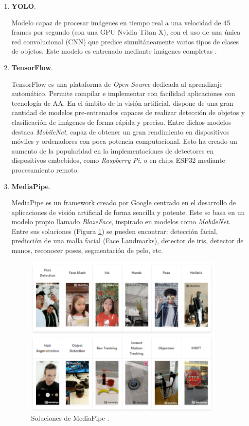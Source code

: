 \begin{enumerate}
	\item \textbf{YOLO}.
	
	Modelo capaz de procesar imágenes en tiempo real a una velocidad de 45 frames por segundo (con una GPU Nvidia Titan X), con el uso de una única red convolucional (CNN) que predice simultáneamente varios tipos de clases de objetos. Este modelo es entrenado mediante imágenes completas \cite{YOLO}.
	
	\item \textbf{TensorFlow}.
	
	TensorFlow es una plataforma de \textit{Open Source} dedicada al aprendizaje automático. Permite compilar e implementar con facilidad aplicaciones con tecnología de AA. En el ámbito de la visión artificial, dispone de una gran cantidad de modelos pre-entrenados capaces de realizar detección de objetos y clasificación de imágenes de forma rápida y precisa. Entre dichos modelos destaca \textit{MobileNet}, capaz de obtener un gran rendimiento en dispositivos móviles y ordenadores con poca potencia computacional. Esto ha creado un aumento de la popularidad en la implementaciones de detectores en dispositivos embebidos, como \textit{Raspberry Pi}, o en chips ESP32 mediante procesamiento remoto.
	
	\item \textbf{MediaPipe}.
	
	MediaPipe \cite{mediapipe} es un framework creado por Google centrado en el desarrollo de aplicaciones de visión artificial de forma sencilla y potente. Este se basa en un modelo propio llamado \textit{BlazeFace}, inspirado en modelos como \textit{MobileNet}. Entre sus soluciones (Figura \ref{fig:solMed}) se pueden encontrar: detección facial, predicción de una malla facial (Face Landmarks), detector de iris, detector de manos, reconocer poses, segmentación de pelo, etc.
	
	\begin{figure}[htp]
		\centering
		\includegraphics[width=10cm]{imagenes/solucionesMediaPipe.png}
		\caption{Soluciones de MediaPipe \cite{mdSolutions}.}
		\label{fig:solMed}
	\end{figure}
	

\end{enumerate}
